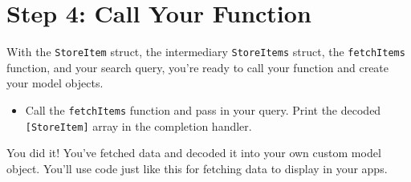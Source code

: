 \documentclass[a4paper,11pt]{scrartcl}
\begin{document}
\section*{Step 4: Call Your Function}

With the \texttt{StoreItem} struct, the intermediary \texttt{StoreItems} struct, the \texttt{fetchItems} function, and your search query, you're ready to call your function and create your model objects.
\begin{itemize}
\item Call the \texttt{fetchItems} function and pass in your query. Print the decoded \texttt{[StoreItem]} array in the completion handler.
\end{itemize}
You did it! You've fetched data and decoded it into your own custom model object. You'll use code just like this for fetching data to display in your apps.
\end{document}

